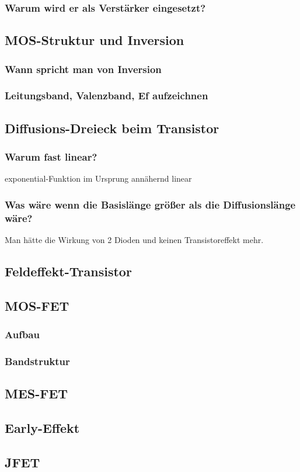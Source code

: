     \subsubsection{Warum wird er als Verst\"arker eingesetzt?}
\subsection{MOS-Struktur und Inversion }\label{k6:mosInversion}

    \subsubsection{Wann spricht man von Inversion}
    \subsubsection{Leitungsband, Valenzband, Ef aufzeichnen}

\subsection{Diffusions-Dreieck beim Transistor }\label{k6:diffusionsdreieck}
    \subsubsection{Warum fast linear?} exponential-Funktion im Ursprung ann\"ahernd linear
    \subsubsection{Was w\"are wenn die Basisl\"ange gr\"o{\ss}er als die Diffusionsl\"ange w\"are?} Man h\"atte die Wirkung von 2 Dioden und keinen Transistoreffekt mehr.

\subsection{Feldeffekt-Transistor }\label{k6:fet}

\subsection{MOS-FET }\label{k6:mosfet}
    \subsubsection{Aufbau}
    \subsubsection{Bandstruktur}

\subsection{MES-FET }\label{k6:mesfet}

\subsection{Early-Effekt }\label{k6:early}

\subsection{JFET }\label{k6:jfet}
